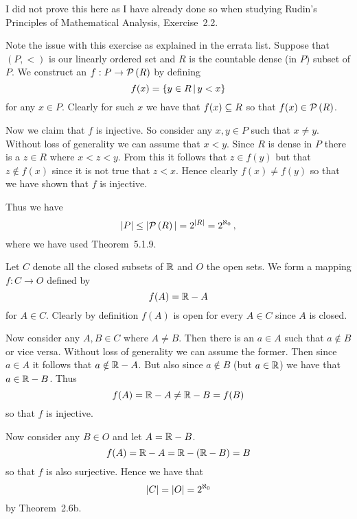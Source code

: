 \begin{solution}
	I did not prove this here as I have already done so when studying Rudin's Principles of Mathematical Analysis, Exercise~2.2.
\end{solution}


\begin{solution}
	Note the issue with this exercise as explained in the errata list.
    Suppose that $(P,<)$ is our linearly ordered set and $R$ is the countable dense (in $P$) subset of $P$.
    We construct an $f : P \to \pset{R}$ by defining
    $$
    f(x) = \braces{y \in R \where y < x}
    $$
    for any $x \in P$.
    Clearly for such $x$ we have that $f(x) \ss R$ so that $f(x) \in \pset{R}$.

    Now we claim that $f$ is injective.
    So consider any $x,y \in P$ such that $x \neq y$.
    Without loss of generality we can assume that $x < y$.
    Since $R$ is dense in $P$ there is a $z \in R$ where $x < z < y$.
    From this it follows that $z \in f(y)$ but that $z \notin f(x)$ since it is not true that $z < x$.
    Hence clearly $f(x) \neq f(y)$ so that we have shown that $f$ is injective.

    Thus we have
    $$
    |P| \leq |\pset{R}| = 2^{|R|} = 2^\N \,,
    $$
    where we have  used Theorem~5.1.9. \qedsymbol
\end{solution}


\begin{solution}
	Let $C$ denote all the closed subsets of $\reals$ and $O$ the open sets.
    We form a mapping $f: C \to O$ defined by
    $$
    f(A) = \reals - A
    $$
    for $A \in C$.
    Clearly by definition $f(A)$ is open for every $A \in C$ since $A$ is closed.

    Now consider any $A,B \in C$ where $A \neq B$.
    Then there is an $a \in A$ such that $a \notin B$ or vice versa.
    Without loss of generality we can assume the former.
    Then since $a \in A$ it follows that $a \notin \reals - A$.
    But also since $a \notin B$ (but $a \in \reals$) we have that $a \in \reals - B$.
    Thus
    $$
    f(A) = \reals - A \neq \reals - B = f(B)
    $$
    so that $f$ is injective.

    Now consider any $B \in O$ and let $A = \reals - B$.
    $$
    f(A) = \reals - A = \reals - (\reals - B) = B
    $$
    so that $f$ is also surjective.
    Hence we have that
    $$
    |C| = |O| = \NI
    $$
    by Theorem~2.6b. \qedsymbol
\end{solution}

